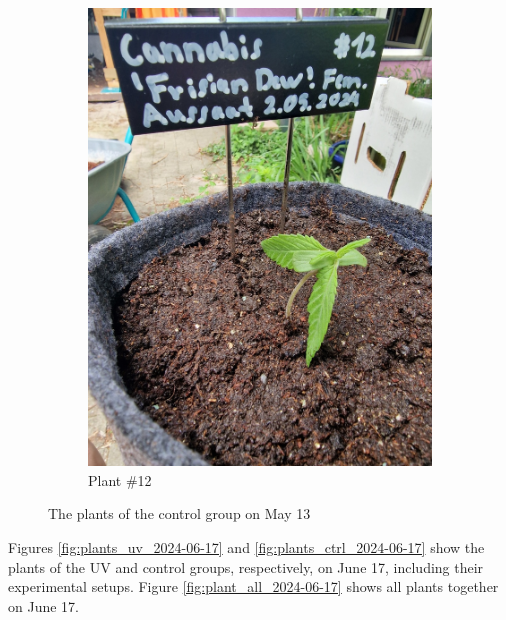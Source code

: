 \begin{figure}[H]
\begin{subfigure}[t]{.19\textwidth}
        \includegraphics[width=\linewidth]{../figures/plant_12_2024-05-13}
        \caption{Plant \#12}
        \label{fig:plant_12_2024-05-13}
    \end{subfigure}
    \caption[Plants of the control group on May 13]{The plants of the control group on May 13}
    \label{fig:plants_ctrl_2024-05-13}
\end{figure}

Figures \ref{fig:plants_uv_2024-06-17} and \ref{fig:plants_ctrl_2024-06-17} show the plants of the UV and control groups, respectively, on June 17, including their experimental setups. Figure \ref{fig:plant_all_2024-06-17} shows all plants together on June 17.

